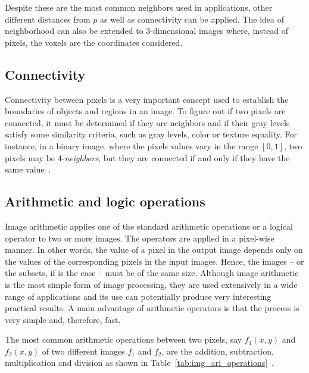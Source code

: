 Despite these are the most common neighbors used in applications, other different distances from $p$ as well as connectivity can be applied. The idea of neighborhood can also be extended to 3-dimensional images where, instead of pixels, the voxels are the coordinates considered.


\subsection{Connectivity}
\label{sec:connectivity}
Connectivity between pixels is a very important concept used to establish the boundaries of objects and regions in an image. To figure out if two pixels are connected, it must be determined if they are neighbors and if their gray levels satisfy some similarity criteria, such as gray levels, color or texture equality. For instance, in a binary image, where the pixels values vary in the range $[0, 1]$, two pixels may be 4-\textit{neighbors}, but they are connected if and only if they have the same value~\citep{gonzalez:02}.


\subsection{Arithmetic and logic operations}
\label{sec:ari_logic_operations}
Image arithmetic applies one of the standard arithmetic operations or a logical operator to two or more images. The operators are applied in a pixel-wise manner. In other words, the value of a pixel in the output image depends only on the values of the corresponding pixels in the input images. Hence, the images -- or the subsets, if is the case -- must be of the same size. Although image arithmetic is the most simple form of image processing, they are used extensively in a wide range of applications and its use can potentially produce very interesting practical results. A main advantage of arithmetic operators is that the process is very simple and, therefore, fast.

The most common arithmetic operations between two pixels, say $f_1(x, y)$ and $f_2(x, y)$ of two different images $f_1$ and $f_2$, are the addition, subtraction, multiplication and division as shown in Table~\ref{tab:img_ari_operations}~\citep{pedrini:08}.

